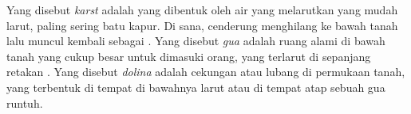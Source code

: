 \begin{definition}\label{def:g9:landforms:karst}
Yang disebut \emph{karst} adalah  yang dibentuk
oleh air yang melarutkan  yang mudah larut, paling sering batu
kapur. Di sana,  cenderung menghilang ke bawah tanah lalu
muncul kembali sebagai . Yang disebut \emph{gua} adalah
ruang alami di bawah tanah yang cukup besar untuk dimasuki orang, yang
terlarut di sepanjang retakan . Yang disebut
\emph{dolina} adalah cekungan atau lubang di permukaan
tanah, yang terbentuk di tempat  di bawahnya larut atau di tempat
atap sebuah gua runtuh.
\end{definition}

